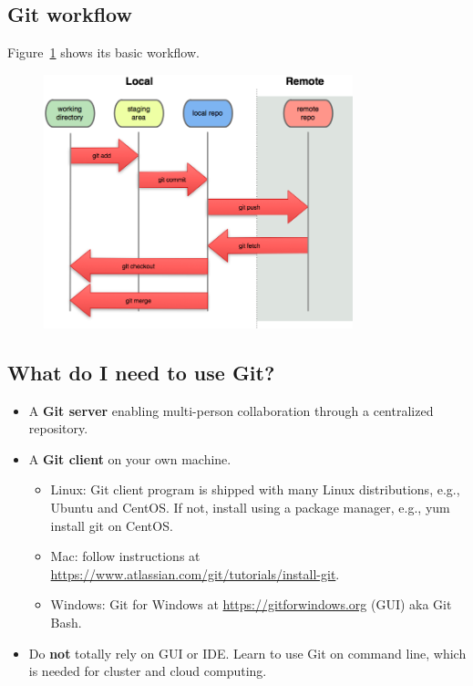 \subsection*{Git workflow}

Figure~\ref{fig:gitflow} shows its basic workflow.
\begin{figure}[!h]
\begin{center}
  \includegraphics[width=0.8\textwidth]{Lecture2/git_workflow.png}
  \caption{}
  \label{fig:gitflow}
\end{center}
\end{figure}

\subsection*{What do I need to use Git?}

\begin{itemize}
\item A {\bf Git server} enabling multi-person collaboration through a centralized repository.
\item A {\bf Git client} on your own machine.

  \begin{itemize}
    \item Linux: Git client program is shipped with many Linux distributions, e.g., Ubuntu and CentOS. If not, install using a package manager, e.g., \colorbox{shadecolor}{yum install git} on CentOS.
    \item Mac: follow instructions at \href{https://www.atlassian.com/git/tutorials/install-git}{https://www.atlassian.com/git/tutorials/install-git}.
    \item Windows: Git for Windows at \href{https://gitforwindows.org}{https://gitforwindows.org} (GUI) aka Git Bash.
  \end{itemize}
\item Do {\bf not} totally rely on GUI or IDE. Learn to use Git on command line, which is needed for cluster and cloud computing.

\end{itemize}

